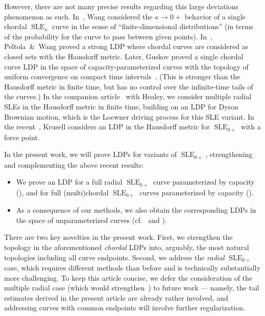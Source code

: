 \documentclass[a4paper, 11pt]{article}
\theoremstyle{definition}
\numberwithin{equation}{section}
\numberwithin{figure}{section}
\newcommand{\SLE}[1][]{\operatorname{SLE}_{#1}}
\begin{document}
However, there are not many precise results regarding this large deviations phenomenon as such. 
In~\cite{Wang:Energy_of_deterministic_Loewner_chain}, 
Wang considered the $\kappa \to 0+$ behavior of a single chordal $\SLE[\kappa]$ curve 
in the sense of ``finite-dimensional distributions'' 
(in terms of the probability for the curve to pass between given points). 
In~\cite{Peltola-Wang:LDP}, 
Peltola~\&~Wang proved a strong LDP where chordal curves are considered 
as closed sets with the Hausdorff metric. 
Later, Guskov proved a single chordal curve LDP in the space of capacity-parameterized curves 
with the topology of uniform convergence on compact time intervals~\cite{Guskov:LPD_for_SLE_in_the_uniform_topology}. 
(This is stronger than the Hausdorff metric in finite time, but has no control over the infinite-time tails of the curves.) 
In the companion article~\cite{AHP:Large_deviations_of_DBM_and_multiradial_SLE} with Healey, 
we consider multiple radial SLEs in the Hausdorff metric in finite time, 
building on an LDP for Dyson Brownian motion, which is the Loewner driving process for this SLE variant.
In the recent~\cite{Krusell:in_prep}, Krusell considers an LDP in the Hausdorff metric for $\SLE[0+]$ with a force point.


In the present work, we will prove LDPs for variants of $\SLE[0+]$, 
strengthening and complementing the above recent results:
\begin{itemize}[leftmargin=*]
\item We prove an LDP for a full radial $\SLE[0+]$ curve parameterized by capacity (),
and for full (multi)chordal $\SLE[0+]$ curves parameterized by capacity (). 


\item As a consequence of our methods, we also obtain the corresponding LDPs in the space of unparameterized curves (cf.~\cite{Kemppainen-Smirnov:Random_curves_scaling_limits_and_Loewner_evolutions} and ).

\end{itemize}
There are two key novelties in the present work.
First, we strengthen the topology in the aforementioned \emph{chordal} LDPs into, arguably, 
the most natural topologies including all curve endpoints. 
Second, we address the \emph{radial} $\SLE[0+]$ case, 
which requires different methods than before and is technically substantially more challenging.
To keep this article concise, we defer the consideration of the multiple radial case 
(which would strengthen~\cite{AHP:Large_deviations_of_DBM_and_multiradial_SLE}) to future work 
--- namely, the tail estimates derived in the present article are already rather involved, 
and addressing curves with common endpoints will involve further regularization.
\end{document}
